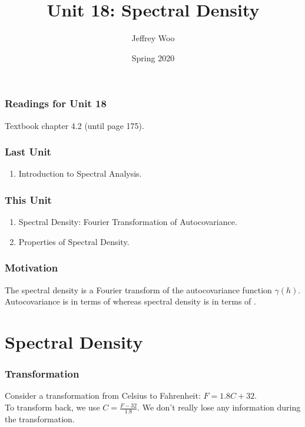 \documentclass[%
xcolor=pdftex]{beamer}
\title{Unit 18: Spectral Density}
\author[STAT 5170: Applied Time Series, Unit 18]{Jeffrey Woo}
\institute{Department of Statistics, University of Virginia}
\date{Spring 2020} %
\begin{document}
\frame{\titlepage}


\begin{frame}
\frametitle{Readings for Unit 18}

Textbook chapter 4.2 (until page 175).

\end{frame}



\begin{frame}
\frametitle{Last Unit}
\begin{enumerate}
\item Introduction to Spectral Analysis.
\end{enumerate}
\end{frame}

\begin{frame}
\frametitle{This Unit}
\begin{enumerate}
\item Spectral Density: Fourier Transformation of Autocovariance.
\item Properties of Spectral Density.
\end{enumerate}
\end{frame}

\begin{frame}
\frametitle{Motivation}

The spectral density is a Fourier transform of the autocovariance function $\gamma(h)$. Autocovariance is in terms of \underline{\hspace{8mm}} whereas spectral density is in terms of \underline{\hspace{10 mm}}.

\end{frame}

\section{Spectral Density}
\frame{\tableofcontents[currentsection]}

\begin{frame}
\frametitle{Transformation}

Consider a transformation from Celsius to Fahrenheit: $F = 1.8C + 32$. \\
\vspace{5mm}
To transform back, we use $C = \frac{F-32}{1.8}$. We don't really lose any information during the transformation.

\end{frame}
\end{document}
